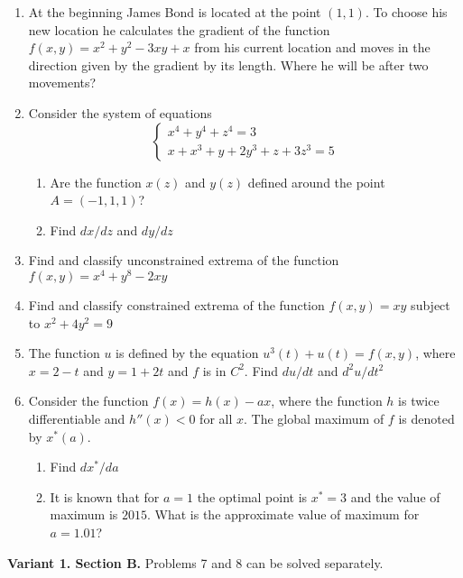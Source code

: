 \begin{enumerate}

\item At the beginning James Bond is located at the point $(1, 1)$. To choose his new location he calculates the gradient of the function $f(x,y)=x^2+y^2 - 3xy+x$ from his current location and moves in the direction given by the gradient by its length. Where he will be after two movements?

\item Consider the system of equations
\[
\begin{cases}
x^4 + y^4 + z^4 = 3 \\
x + x^3 + y + 2y^3 + z + 3z^3 = 5
\end{cases}
\]

\begin{enumerate}
\item Are the function $x(z)$ and $y(z)$ defined around the point $A=(-1,1,1)$?
\item Find $dx/dz$ and $dy/dz$
\end{enumerate}


\item Find and classify unconstrained extrema of the function $f(x,y)=x^4 + y^8 - 2xy$

\item Find and classify constrained extrema of the function $f(x, y) =  xy$ subject to $x^2 + 4y^2= 9$


\item The function $u$ is defined by the equation $u^3(t) + u(t) = f(x,y)$, where $x=2-t$ and $y=1+2t$ and $f$ is in $C^2$. Find $du/dt$ and $d^2 u/dt^2$


\item Consider the function $f(x)=h(x)-ax$, where the function $h$ is twice differentiable and $h''(x)<0$ for all $x$. The global maximum of $f$ is denoted by $x^*(a)$.
\begin{enumerate}
\item Find $dx^*/da$
\item It is known that for $a=1$ the optimal point is $x^*=3$ and the value of maximum is $2015$. What is the approximate value of maximum for $a=1.01$?
\end{enumerate}

\end{enumerate}



\textbf{Variant 1. Section B.} Problems 7 and 8 can be solved separately.

